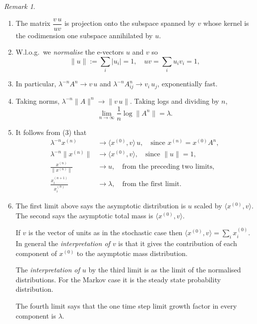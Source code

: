 \documentclass[a4paper]{amsart}
\theoremstyle{plain}
\theoremstyle{definition}
\theoremstyle{remark}
\newtheorem{remark}[theorem]{Remark}
\begin{document}
\begin{remark}\mbox{}

\begin{enumerate}
\item The matrix $ \dfrac{v\, u}{uv} $ is projection onto the subspace spanned by $ v $ whose kernel is the codimension one subspace annihilated by $ u $.

\item W.l.o.g.\  we \emph{normalise} the e-vectors $ u $ and $ v $ so 
\[
\|u\|:= \sum_i|u_i| = 1 , \quad  u v = \sum_i u_i v_i =1 , 
 \]
 \item 
In particular,  $  \lambda ^{-n}A ^n   \to  v \, u $ and  $  \lambda ^{-n}A ^n_{ij}  \to  v_i\, u_j $, exponentially fast. 


\item  Taking norms, $   \lambda  ^{-n} \|A\|^n \to \|v\, u\| $.  Taking logs and dividing by $ n $, 
\[   \lim_{n\to \infty} \frac{1}{n} \log \|A^n\| =  \lambda . \]

\item It follows from (3) that
\begin{align*}
\lambda ^{-n} x^{(n)} &\to \langle x^{(0)},v\rangle\, u ,  \quad \text{since } x^{(n)} = x^{(0)} A^n, \\
\lambda ^{-n} \|x^{(n)}\| &\to \langle x^{(0)},v\rangle,  \quad \text{since }  \|u\|=1,  \\
\frac{x^{(n)}}{\|x^{(n)}\|}  &\to u, \quad \text{from the preceding two limits},     \\
\frac{x^{(n+1)}_i}{ x^{(n)}_i}  &\to \lambda,  \quad \text{from the first limit} . 
\end{align*} 

\item The first limit above says the asymptotic distribution is  $ u $ scaled by $ \langle x^{(0)},v\rangle  $.
The second says the asymptotic total mass is $ \langle x^{(0)},v\rangle $.

If $ v $ is the vector of units as in the stochastic case then $ \langle x^{(0)},v\rangle = \sum_i x^{(0)}_ i  $.
In general the \emph{interpretation of $ v $} is that it gives the contribution of each component of $  x^{(0)}$ to the asymptotic mass distribution.   

The \emph{interpretation of $ u $} by the third limit is as  the limit of the normalised distributions.  For the Markov case it is the steady state probability distribution.

The fourth limit says that the one time step limit growth factor in every component is $ \lambda $.
\end{enumerate} 
\end{remark}
\end{document}
